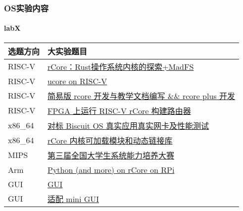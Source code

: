\begin{frame}
	\frametitle{OS实验内容}
	\framesubtitle{labX}
	
\begin{longtable}[]{@{}|l|l|@{}}
	\toprule
	选题方向 & 大实验题目\tabularnewline
	\midrule
	\endhead
	RISC-V &
	\href{https://www.bilibili.com/video/BV1Yy4y1e7zR?p=24}{rCore：Rust操作系统内核的探索+MadFS}\tabularnewline  \hline
	RISC-V &
	\href{http://os.cs.tsinghua.edu.cn/oscourse/OS2019spring/projects/g01}{ucore
		on RISC-V}\tabularnewline  \hline
	RISC-V &
	\href{http://os.cs.tsinghua.edu.cn/oscourse/OS2019spring/projects/g02}{简易版
		rcore 开发与教学文档编写 \&\& rcore plus 开发}\tabularnewline \hline
	RISC-V &
	\href{http://os.cs.tsinghua.edu.cn/oscourse/OS2019spring/projects/g05}{FPGA
		上运行 RISC-V rCore 构建路由器}\tabularnewline \hline
	x86\_64 &
	\href{http://os.cs.tsinghua.edu.cn/oscourse/OS2019spring/projects/g04}{对标
		Biscuit OS 真实应用真实网卡及性能测试}\tabularnewline \hline
	x86\_64 &
	\href{http://os.cs.tsinghua.edu.cn/oscourse/OS2019spring/projects/g06}{rCore
		内核可加载模块和动态链接库}\tabularnewline \hline
	MIPS &
	\href{http://os.cs.tsinghua.edu.cn/oscourse/OS2019spring/projects/g03}{第三届全国大学生系统能力培养大赛}\tabularnewline \hline
	Arm &
	\href{http://os.cs.tsinghua.edu.cn/oscourse/OS2019spring/projects/g11}{Python
		(and more) on rCore on RPi}\tabularnewline \hline
	GUI &
	\href{http://os.cs.tsinghua.edu.cn/oscourse/OsTrain2019/g2}{GUI}\tabularnewline \hline
	GUI & \href{http://os.cs.tsinghua.edu.cn/oscourse/OsTrain2019/g3}{适配
		mini GUI}\tabularnewline \hline

	
	\bottomrule
\end{longtable}


\end{frame}



